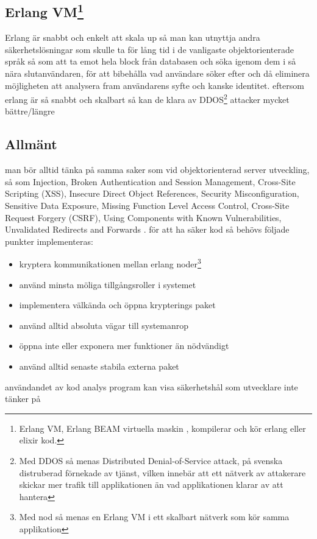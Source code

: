 \documentclass[12pt]{article}
\begin{document}
\subsection*{Erlang VM\footnote{Erlang VM, Erlang BEAM virtuella maskin , kompilerar och kör erlang eller elixir kod\cite{erlang}.}}
	Erlang är snabbt och enkelt att skala up så man kan utnyttja andra säkerhetslösningar som skulle ta för lång tid i de vanligaste objektorienterade språk  så som att ta emot hela block från databasen och söka igenom dem i så nära slutanvändaren, för att bibehålla vad användare söker efter och då eliminera möjligheten att analysera fram användarens syfte och kanske identitet\cite{database}. eftersom erlang är så snabbt och skalbart så kan de klara av DDOS\footnote{Med DDOS så menas Distributed Denial-of-Service attack, på svenska distruberad förnekade av tjänst, vilken innebär att ett nätverk av attakerare skickar mer trafik till applikationen än vad applikationen klarar av att hantera} attacker mycket bättre/längre\cite{resource-safe}
\subsection*{Allmänt}
	man bör alltid tänka på samma saker som vid objektorienterad server utveckling, så som Injection, Broken Authentication and Session Management, Cross-Site Scripting (XSS), Insecure Direct Object References, Security Misconfiguration, Sensitive Data Exposure, Missing Function Level Access Control, Cross-Site Request Forgery (CSRF), Using Components with Known Vulnerabilities, Unvalidated Redirects and Forwards \cite{owasp}.
	för att ha säker kod så behövs följade punkter implementeras:
	\begin{itemize} 
		\item kryptera kommunikationen mellan erlang noder\footnote{Med nod så menas en Erlang VM i ett skalbart nätverk som kör samma applikation}
		\item använd minsta möliga tillgångsroller i systemet
		\item implementera välkända och öppna krypterings paket
		\item använd alltid absoluta vägar till systemanrop
		\item öppna inte eller exponera mer funktioner än nödvändigt
		\item använd alltid senaste stabila externa paket
	\end{itemize}
användandet av kod analys program kan visa säkerhetshål som utvecklare inte tänker på
\end{document}
